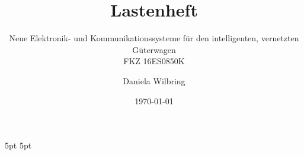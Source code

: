 \documentclass[11pt,a4paper,parskip]{scrartcl}
\author{Daniela Wilbring}
\title{Lastenheft}
\subtitle{Neue Elektronik- und Kommunikationssysteme für den intelligenten, vernetzten Güterwagen\\FKZ 16ES0850K}
\date{\today}
\begin{document}
\theoremstyle{remark}
\newtheorem{rem}{Remark}
\theoremstyle{definition}
\newtheorem{feat}{Merkmal}
  {5pt}%
  {5pt}%
  {}%
  {}%
  {\bfseries}%
  {}%
  {\newline}%
  {}%

\setlength{\parskip}{5mm plus5mm minus5mm} %
\maketitle \newpage
\tableofcontents \newpage
 \newpage
%
\appendix


\end{document}

